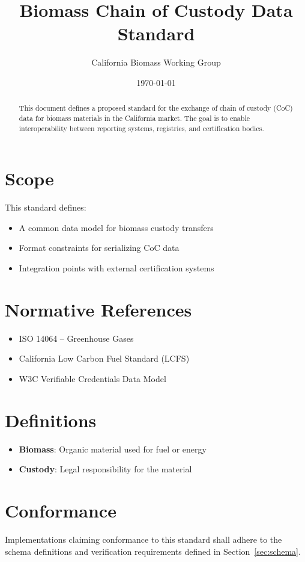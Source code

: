 \documentclass[12pt]{article}
\title{Biomass Chain of Custody Data Standard}
\author{California Biomass Working Group}
\date{\today}
\begin{document}
\maketitle
\begin{abstract}
This document defines a proposed standard for the exchange of chain of custody (CoC) data for biomass materials in the California market. The goal is to enable interoperability between reporting systems, registries, and certification bodies.
\end{abstract}

\section{Scope}
This standard defines:
\begin{itemize}[topsep=0.5em]
  \item A common data model for biomass custody transfers
  \item Format constraints for serializing CoC data
  \item Integration points with external certification systems
\end{itemize}

\section{Normative References}
\begin{itemize}
  \item ISO 14064 – Greenhouse Gases
  \item California Low Carbon Fuel Standard (LCFS)
  \item W3C Verifiable Credentials Data Model
\end{itemize}

\section{Definitions}
\begin{itemize}
  \item \textbf{Biomass}: Organic material used for fuel or energy
  \item \textbf{Custody}: Legal responsibility for the material
\end{itemize}

\section{Conformance}
Implementations claiming conformance to this standard shall adhere to the schema definitions and verification requirements defined in Section~\ref{sec:schema}.
\end{document}
